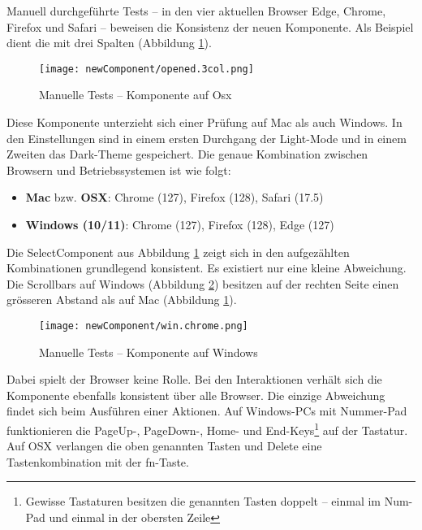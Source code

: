 Manuell durchgeführte Tests – in den vier aktuellen Browser Edge, Chrome, Firefox und Safari – beweisen die Konsistenz der neuen Komponente. 
Als Beispiel dient die  mit drei Spalten (Abbildung \ref{img:manualTestComponentOsx}). 

\begin{figure}[!htb]
    \centering
    \texttt{[image: newComponent/opened.3col.png]}
    \caption{\centering Manuelle Tests – Komponente auf Osx}
    \label{img:manualTestComponentOsx}
\end{figure}

Diese Komponente unterzieht sich einer Prüfung auf Mac als auch Windows. 
In den Einstellungen sind in einem ersten Durchgang der Light-Mode und in einem Zweiten das Dark-Theme gespeichert. 
Die genaue Kombination zwischen Browsern und Betriebssystemen ist wie folgt: 

\begin{itemize}
    \item \textbf{Mac} bzw. \textbf{OSX}: Chrome (127), Firefox (128), Safari (17.5)
    \item \textbf{Windows (10/11)}: Chrome (127), Firefox (128), Edge (127)
\end{itemize}

Die SelectComponent aus Abbildung \ref{img:manualTestComponentOsx} zeigt sich in den aufgezählten Kombinationen grundlegend konsistent. 
Es existiert nur eine kleine Abweichung. 
Die Scrollbars auf Windows (Abbildung \ref{img:manualTestComponentWin}) besitzen auf der rechten Seite einen grösseren Abstand als auf Mac (Abbildung \ref{img:manualTestComponentOsx}). 

\begin{figure}[!htb]
    \centering
    \texttt{[image: newComponent/win.chrome.png]}
    \caption{\centering Manuelle Tests – Komponente auf Windows}
    \label{img:manualTestComponentWin}
\end{figure}

Dabei spielt der Browser keine Rolle. 
Bei den Interaktionen verhält sich die Komponente ebenfalls konsistent über alle Browser. 
Die einzige Abweichung findet sich beim Ausführen einer Aktionen. 
Auf Windows-PCs mit Nummer-Pad funktionieren die Page\-Up-, Page\-Down-, Home- und End-Keys\footnote{
    Gewisse Tastaturen besitzen die genannten Tasten doppelt – einmal im Num-Pad und einmal in der obersten Zeile
} auf der Tastatur. 
Auf OSX verlangen die oben genannten Tasten und Delete eine Tastenkombination mit der fn-Taste. 

